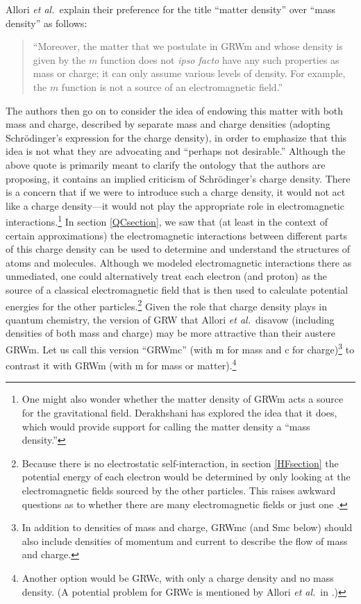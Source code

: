 \documentclass[onecolumn,secnumarabic,amsmath,amssymb,balancelastpage,nofootinbib]{article}
\begin{document}
Allori \emph{et al.}\ explain their preference for the title ``matter density'' over ``mass density'' as follows:
\begin{quote}
``Moreover, the matter that we postulate in GRWm and whose density is given by the $m$ function does not \emph{ipso facto} have any such properties as mass or charge; it can only assume various levels of density. For example, the $m$ function is not a source of an electromagnetic field.'' \cite[pg.\ 331--332]{allori2014}
\end{quote}
The authors then go on to consider the idea of endowing this matter with both mass and charge, described by separate mass and charge densities (adopting Schr\"{o}dinger's expression for the charge density), in order to emphasize that this idea is not what they are advocating and ``perhaps not desirable.''  Although the above quote is primarily meant to clarify the ontology that the authors are proposing, it contains an implied criticism of Schr\"{o}dinger's charge density.  There is a concern that if we were to introduce such a charge density, it would not act like a charge density---it would not play the appropriate role in electromagnetic interactions.\footnote{One might also wonder whether the matter density of GRWm acts a source for the gravitational field.  Derakhshani \cite{derakhshani2014} has explored the idea that it does, which would provide support for calling the matter density a ``mass density.''}  In section \ref{QCsection}, we saw that (at least in the context of certain approximations) the electromagnetic interactions between different parts of this charge density can be used to determine and understand the structures of atoms and molecules.  Although we modeled electromagnetic interactions there as unmediated, one could alternatively treat each electron (and proton) as the source of a classical electromagnetic field that is then used to calculate potential energies for the other particles.\footnote{Because there is no electrostatic self-interaction, in section \ref{HFsection} the potential energy of each electron would be determined by only looking at the electromagnetic fields sourced by the other particles.  This raises awkward questions as to whether there are many electromagnetic fields or just one \cite[pg.\ 36, 158]{lange}.}  Given the role that charge density plays in quantum chemistry, the version of GRW that Allori \emph{et al.}\ disavow (including densities of both mass and charge) may be more attractive than their austere GRWm.  Let us call this version ``GRWmc'' (with m for mass and c for charge)\footnote{In addition to densities of mass and charge, GRWmc (and Smc below) should also include densities of momentum and current to describe the flow of mass and charge.} to contrast it with GRWm (with m for mass or matter).\footnote{Another option would be GRWc, with only a charge density and no mass density.  (A potential problem for GRWc is mentioned by Allori \emph{et al.}\ in \cite[footnote 1]{allori2011}.)}
\end{document}
